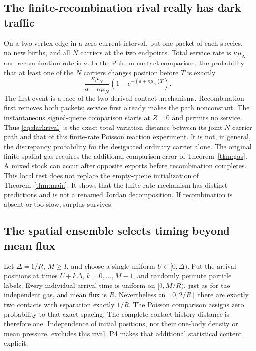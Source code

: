 \documentclass[11pt]{article}
\theoremstyle{definition}\newtheorem{definition}[theorem]{Definition}
\theoremstyle{remark}\newtheorem{remark}[theorem]{Remark}
\begin{document}
\subsection{The finite-recombination rival really has dark traffic}
On a two-vertex edge in a zero-current interval, put one packet of each species, no new births, and all $N$ carriers at the two endpoints. Total service rate is $\kappa\mu_N$ and recombination rate is $a$. In the Poisson contact comparison, the probability that at least one of the $N$ carriers changes position before $T$ is exactly
\begin{equation}
 \frac{\kappa\mu_N}{a+\kappa\mu_N}
       \left(1-e^{-(a+\kappa\mu_N)T}\right).
 \label{eq:darkrival}
\end{equation}
The first event is a race of the two derived contact mechanisms. Recombination first removes both packets; service first already makes the path nonconstant. The instantaneous signed-queue comparison starts at $Z=0$ and permits no service. Thus \eqref{eq:darkrival} is the exact total-variation distance between its joint $N$-carrier path and that of this finite-rate Poisson reaction experiment. It is not, in general, the discrepancy probability for the designated ordinary carrier alone. The original finite spatial gas requires the additional comparison error of Theorem~\ref{thm:gas}. A mixed stock can occur after opposite exports before recombination completes. This local test does not replace the empty-queue initialization of Theorem~\ref{thm:main}. It shows that the finite-rate mechanism has distinct predictions and is not a renamed Jordan decomposition. If recombination is absent or too slow, surplus survives.

\subsection{The spatial ensemble selects timing beyond mean flux}
Let $\Delta=1/R$, $M\ge3$, and choose a single uniform $U\in[0,\Delta)$. Put the arrival positions at times $U+k\Delta$, $k=0,\ldots,M-1$, and randomly permute particle labels. Every individual arrival time is uniform on $[0,M/R)$, just as for the independent gas, and mean flux is $R$. Nevertheless on $[0,2/R]$ there are exactly two contacts with separation exactly $1/R$. The Poisson comparison assigns zero probability to that exact spacing. The complete contact-history distance is therefore one. Independence of initial positions, not their one-body density or mean pressure, excludes this rival. P4 makes that additional statistical content explicit.
\end{document}
